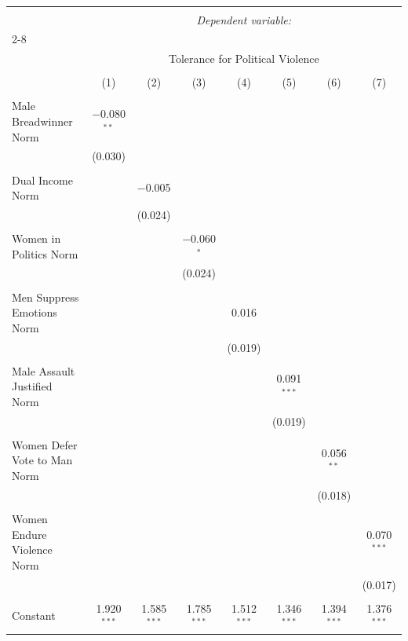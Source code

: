 
\begin{table}[!htbp] \centering 
  \caption{} 
  \label{} 
\begin{tabular}{@{\extracolsep{5pt}}lccccccc} 
\\[-1.8ex]\hline 
\hline \\[-1.8ex] 
 & \multicolumn{7}{c}{\textit{Dependent variable:}} \\ 
\cline{2-8} 
\\[-1.8ex] & \multicolumn{7}{c}{Tolerance for Political Violence} \\ 
\\[-1.8ex] & (1) & (2) & (3) & (4) & (5) & (6) & (7)\\ 
\hline \\[-1.8ex] 
 Male Breadwinner Norm & $-$0.080$^{**}$ &  &  &  &  &  &  \\ 
  & (0.030) &  &  &  &  &  &  \\ 
  & & & & & & & \\ 
 Dual Income Norm &  & $-$0.005 &  &  &  &  &  \\ 
  &  & (0.024) &  &  &  &  &  \\ 
  & & & & & & & \\ 
 Women in Politics Norm &  &  & $-$0.060$^{*}$ &  &  &  &  \\ 
  &  &  & (0.024) &  &  &  &  \\ 
  & & & & & & & \\ 
 Men Suppress Emotions Norm &  &  &  & 0.016 &  &  &  \\ 
  &  &  &  & (0.019) &  &  &  \\ 
  & & & & & & & \\ 
 Male Assault Justified Norm &  &  &  &  & 0.091$^{***}$ &  &  \\ 
  &  &  &  &  & (0.019) &  &  \\ 
  & & & & & & & \\ 
 Women Defer Vote to Man Norm &  &  &  &  &  & 0.056$^{**}$ &  \\ 
  &  &  &  &  &  & (0.018) &  \\ 
  & & & & & & & \\ 
 Women Endure Violence Norm &  &  &  &  &  &  & 0.070$^{***}$ \\ 
  &  &  &  &  &  &  & (0.017) \\ 
  & & & & & & & \\ 
 Constant & 1.920$^{***}$ & 1.585$^{***}$ & 1.785$^{***}$ & 1.512$^{***}$ & 1.346$^{***}$ & 1.394$^{***}$ & 1.376$^{***}$ \\ 

\end{tabular}
\end{table}
